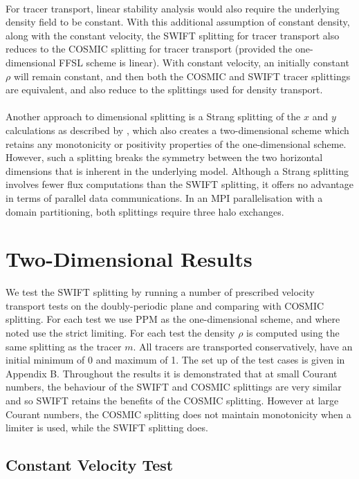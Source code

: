 \documentclass{ametsocV6.1}
\begin{document}
\\
For tracer transport, linear stability analysis would also require the underlying density field to be constant.
With this additional assumption of constant density, along with the constant velocity, the SWIFT splitting for tracer transport also reduces to the COSMIC splitting for tracer transport (provided the one-dimensional FFSL scheme is linear).
With constant velocity, an initially constant $\rho$ will remain constant, and then both the COSMIC and SWIFT tracer splittings are equivalent, and also reduce to the splittings used for density transport. \\
\\
Another approach to dimensional splitting is a Strang splitting of the $x$ and $y$ calculations as described by \citet{skamarock2006limiters}, which also creates a two-dimensional scheme which retains any monotonicity or positivity properties of the one-dimensional scheme.
However, such a splitting breaks the symmetry between the two horizontal dimensions that is inherent in the underlying model.
Although a Strang splitting involves fewer flux computations than the SWIFT splitting, it offers no advantage in terms of parallel data communications.
In an MPI parallelisation with a domain partitioning, both splittings require three halo exchanges.

\section{Two-Dimensional Results} \label{sec:results2d}

We test the SWIFT splitting by running a number of prescribed velocity transport tests on the doubly-periodic plane and comparing with COSMIC splitting. For each test we use PPM as the one-dimensional scheme, and where noted use the strict limiting. For each test the density $\rho$ is computed using the same splitting as the tracer $m$.
All tracers are transported conservatively, have an initial minimum of 0 and maximum of 1.
The set up of the test cases is given in Appendix B.
Throughout the results it is demonstrated that at small Courant numbers, the behaviour of the SWIFT and COSMIC splittings are very similar and so SWIFT retains the benefits of the COSMIC splitting. However at large Courant numbers, the COSMIC splitting does not maintain monotonicity when a limiter is used, while the SWIFT splitting does.

\subsection{Constant Velocity Test} \label{sec:test1}
\end{document}
